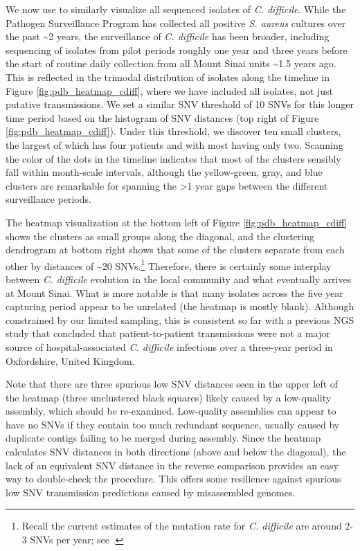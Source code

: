 We now use \pathogendbviz{} to similarly visualize all sequenced isolates of \emph{C. difficile}. While the Pathogen Surveillance Program has collected all positive \emph{S. aureus} cultures over the past \textasciitilde{}2 years, the surveillance of \emph{C. difficile} has been broader, including sequencing of isolates from pilot periods roughly one year and three years before the start of routine daily collection from all Mount Sinai units \textasciitilde{}1.5 years ago. This is reflected in the trimodal distribution of isolates along the timeline in Figure \ref{fig:pdb_heatmap_cdiff}, where we have included all isolates, not just putative transmissions. We set a similar SNV threshold of 10 SNVs for this longer time period based on the histogram of SNV distances (top right of Figure \ref{fig:pdb_heatmap_cdiff}). Under this threshold, we discover ten small clusters, the largest of which has four patients and with most having only two. Scanning the color of the dots in the timeline indicates that most of the clusters sensibly fall within month-scale intervals, although the yellow-green, gray, and blue clusters are remarkable for spanning the >1 year gaps between the different surveillance periods.

The heatmap visualization at the bottom left of Figure \ref{fig:pdb_heatmap_cdiff} shows the clusters as small groups along the diagonal, and the clustering dendrogram at bottom right shows that some of the clusters separate from each other by distances of \textasciitilde{}20 SNVs.\footnote{Recall the current estimates of the mutation rate for \emph{C. difficile} are around 2-3 SNVs per year; see \textcite{Eyre2013,Eyre2012}.} Therefore, there is certainly some interplay between \emph{C. difficile} evolution in the local community and what eventually arrives at Mount Sinai. What is more notable is that many isolates across the five year capturing period appear to be unrelated (the heatmap is mostly blank). Although constrained by our limited sampling, this is consistent so far with a previous NGS study that concluded that patient-to-patient transmissions were not a major source of hospital-associated \emph{C. difficile} infections over a three-year period in Oxfordshire, United Kingdom.\autocite{Eyre2013}

Note that there are three spurious low SNV distances seen in the upper left of the heatmap (three unclustered black squares) likely caused by a low-quality assembly, which should be re-examined. Low-quality assemblies can appear to have no SNVs if they contain too much redundant sequence, usually caused by duplicate contigs failing to be merged during assembly. Since the heatmap calculates SNV distances in both directions (above and below the diagonal), the lack of an equivalent SNV distance in the reverse comparison provides an easy way to double-check the procedure. This offers some resilience against spurious low SNV transmission predictions caused by misassembled genomes.

